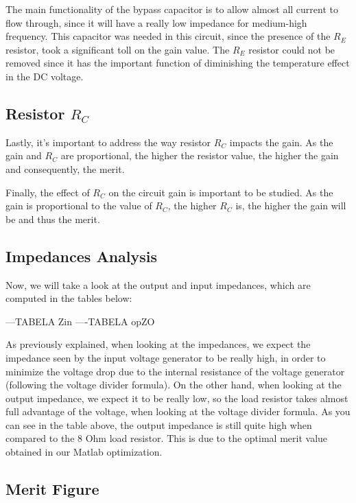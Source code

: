 \par 
The main functionality of the bypass capacitor is to allow almost all current to flow through, since it will have a really low impedance for medium-high frequency. This capacitor was needed in this circuit, since the presence of the $R_E$ resistor, took a significant toll on the gain value. The $R_E$ resistor could not be removed since it has the important function of diminishing the temperature effect in the DC voltage.
 

\subsection{Resistor $R_C$}

\par Lastly, it's important to address the way resistor $R_C$ impacts the gain. As the gain and $R_C$ are proportional, the higher the resistor value, the higher the gain and consequently, the merit.

Finally, the effect of $R_C$ on the circuit gain is important to be studied. As the gain is proportional to the value of $R_C$, the higher $R_C$ is, the higher the gain will be and thus the merit.   

\subsection{Impedances Analysis}

Now, we will take a look at the output and input impedances, which are computed in the tables below:


---TABELA Zin
----TABELA opZO

As previously explained, when looking at the impedances, we expect the impedance seen by the input voltage generator to be really high, in order to minimize the voltage drop due to the internal resistance of the voltage generator (following the voltage divider formula). On the other hand, when looking at the output impedance, we expect it to be really low, so the load resistor takes almost full advantage of the voltage, when looking at the voltage divider formula. As you can see in the table above, the output impedance is still quite high when compared to the 8 Ohm load resistor. This is due to the optimal merit value obtained in our Matlab optimization.



\subsection{Merit Figure}

